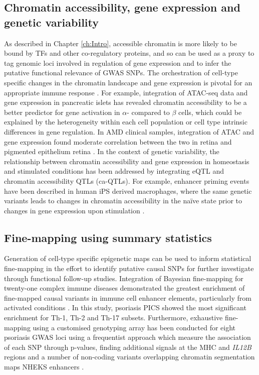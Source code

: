 \subsection{Chromatin accessibility, gene expression and genetic variability}
As described in Chapter \ref{ch:Intro}, accessible chromatin is more likely to be bound by TFs and other co-regulatory proteins, and so can be used as a proxy to tag genomic loci involved in regulation of gene expression and to infer the putative functional relevance of GWAS SNPs. The orchestration of cell-type specific changes in the chromatin landscape and gene expression is pivotal for an appropriate immune response \parencite{Goodnow2005}. For example, integration of ATAC-seq data and gene expression in pancreatic islets has revealed chromatin accessibility to be a better predictor for gene activation in $\alpha$- compared to $\beta$ cells, which could be explained by the heterogeneity within each cell population or cell type intrinsic differences in gene regulation. In AMD clinical samples, integration of ATAC and gene expression found moderate correlation between the two in retina and pigmented epithelium retina \parencite{Wang2018}. In the context of genetic variability, the relationship between chromatin accessibility and gene expression in homeostasis and stimulated conditions has been addressed by integrating eQTL and chromatin accessibility QTLs (ca-QTLs). For example, enhancer priming events have been described in human iPS derived macrophages, where the same genetic variants leads to changes in chromatin accessibility in the na\"{i}ve state prior to changes in gene expression upon stimulation \parencite{Alasoo2018}. 


\subsection{Fine-mapping using summary statistics}

Generation of cell-type specific epigenetic maps can be used to inform statistical fine-mapping in the effort to identify putative causal SNPs for further investigate through functional follow-up studies. Integration of Bayesian fine-mapping for twenty-one complex immune diseases demonstrated the greatest enrichment of fine-mapped causal variants in immune cell enhancer elements, particularly from activated conditions \parencite{Farh2015}. In this study, psoriasis PICS showed the most significant enrichment for Th-1, Th-2 and Th-17 subsets. Furthermore, exhaustive fine-mapping using a customised genotyping array has been conducted for eight psoriasis GWAS loci using a frequentist approach which measure the association of each SNP through p-values, finding additional signals at the MHC and  \textit{IL12B} regions and a number of non-coding variants overlapping chromatin segmentation maps NHEKS enhancers \parencite{Das2014}.

